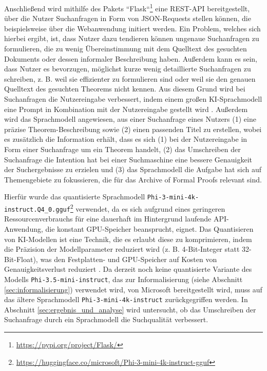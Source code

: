 \documentclass[12pt,letterpaper]{article} %
\begin{document}
Anschließend wird mithilfe des Pakets ``Flask``\footnote{\url{https://pypi.org/project/Flask/}} eine REST-API bereitgestellt, über die Nutzer Suchanfragen in Form von JSON-Requests stellen können, die beispielsweise über die Webanwendung initiert werden.
Ein Problem, welches sich hierbei ergibt, ist, dass Nutzer dazu tendieren können ungenaue Suchanfragen zu formulieren, die zu wenig Übereinstimmung mit dem Quelltext des gesuchten Dokuments oder dessen informaler Beschreibung haben.
Außerdem kann es sein, dass Nutzer es bevorzugen, möglichst kurze wenig detaillierte Suchanfragen zu schreiben, z. B. weil sie effizienter zu formulieren sind oder weil sie den genauen Quelltext des gesuchten Theorems nicht kennen.
Aus diesem Grund wird bei Suchanfragen die Nutzereingabe verbessert, indem einem großen KI-Sprachmodell eine Prompt in Kombination mit der Nutzereingabe gestellt wird \citep{jagerman_query_2023}.
Außerdem wird das Sprachmodell angewiesen, aus einer Suchanfrage eines Nutzers (1) eine präzise Theorem-Beschreibung sowie (2) einen passenden Titel zu erstellen, wobei es zusätzlich die Information erhält, dass es sich (1) bei der Nutzereingabe in Form einer Suchanfrage um ein Theorem handelt, (2) das Umschreiben der Suchanfrage die Intention hat bei einer Suchmaschine eine bessere Genauigkeit der Suchergebnisse zu erzielen und (3) das Sprachmodell die Aufgabe hat sich auf Themengebiete zu fokussieren, die für das Archive of Formal Proofs relevant sind.

Hierfür wurde das quantisierte Sprachmodell \texttt{Phi-3-mini-4k-instruct.Q4\_0.gguf}\footnote{\url{https://huggingface.co/microsoft/Phi-3-mini-4k-instruct-gguf}} verwendet, da es sich aufgrund eines geringeren Ressourcenverbrauchs für eine dauerhaft im Hintergrund laufende API-Anwendung, die konstant GPU-Speicher beansprucht, eignet.
Das Quantisieren von KI-Modellen ist eine Technik, die es erlaubt diese zu komprimieren, indem die Präzision der Modellparameter reduziert wird (z. B. 4-Bit-Integer statt 32-Bit-Float), was den Festplatten- und GPU-Speicher auf Kosten von Genauigkeitsverlust reduziert \citep{dettmers_llmint8_2022}.
Da derzeit noch keine quantisierte Variante des Modells \texttt{Phi-3.5-mini-instruct}, das zur Informalisierung (siehe Abschnitt \ref{sec:informalisierung}) verwendet wird, von Microsoft bereitgestellt wird, muss auf das ältere Sprachmodell \texttt{Phi-3-mini-4k-instruct} zurückgegriffen werden.
In Abschnitt \ref{sec:ergebnis_und_analyse} wird untersucht, ob das Umschreiben der Suchanfrage durch ein Sprachmodell die Suchqualität verbessert.
\end{document}
